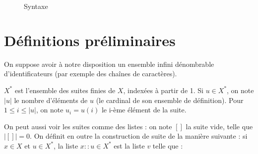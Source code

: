 \begin{figure}



  \caption{Syntaxe}
  \label{fig:stx}
\end{figure}

\section{Définitions préliminaires}

On suppose avoir à notre disposition un ensemble infini dénombrable
d'identificateurs \sId (par exemple des chaînes de caractères).

$X^*$ est l'ensemble des suites finies de $X$, indexées à partir de 1. Si $u ∈
X^*$, on note $|u|$ le nombre d'éléments de $u$ (le cardinal de son ensemble de
définition). Pour $1 ≤ i ≤ |u|$, on note $u_i = u(i)$ le i-ème élément de la
suite.

On peut aussi voir les suites comme des listes : on note $[]$ la suite vide,
telle que $|[]| = 0$. On définit en outre la construction de suite de la manière
suivante : si $x ∈ X$ et $u ∈ X^*$, la liste $x::u ∈ X^*$ est la liste $v$ telle
que :

